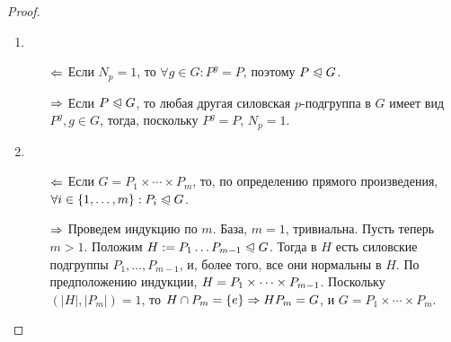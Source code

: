 \begin{proof}~
	\begin{enumerate}
		\item \begin{itemize}
			\item[$\Leftarrow$] Если $N_p = 1$, то $\forall g \in G: P^g = P$, поэтому $P \trianglelefteqslant G$.
			
			\item[$\Rightarrow$] Если $P \trianglelefteqslant G$, то любая другая силовская $p$-подгруппа в $G$ имеет вид $P^g, g \in G$, тогда, поскольку $P^g = P$, $N_p = 1$.
		\end{itemize}
		
		\item \begin{itemize}
			\item[$\Leftarrow$] Если $G = P_1 \times \dotsb \times P_m$, то, по определению прямого произведения, $\forall i \hm\in \{1, \dotsc, m\}: P_i \normal G$.
			
			\item[$\Rightarrow$] Проведем индукцию по $m$. База, $m = 1$, тривиальна. Пусть теперь $m > 1$. Положим $H := P_1\dots P_{m - 1} \trianglelefteqslant G$. Тогда в $H$ есть силовские подгруппы $P_1, \dotsc, P_{m - 1}$, и, более того, все они нормальны в $H$. По предположению индукции, $H \hm= P_1 \times \dotsb \times P_{m-1}$. Поскольку $(|H|, |P_m|) = 1$, то $H \cap P_m \hm= \{e\} \ra HP_m \hm= G$, и $G = P_1 \times \dotsb \times P_m$.
		\end{itemize}
	\end{enumerate}
\end{proof}